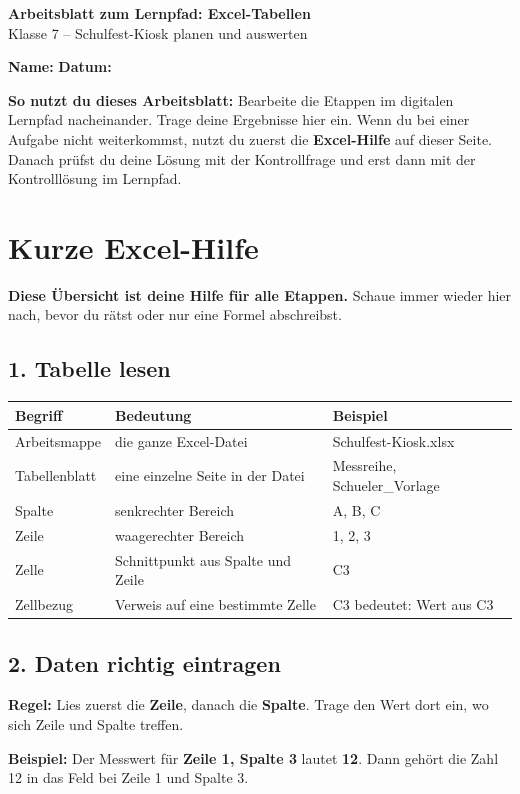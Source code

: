 
\begin{center}
{\LARGE\bfseries Arbeitsblatt zum Lernpfad: Excel-Tabellen}\\[1mm]
{\large Klasse 7 -- Schulfest-Kiosk planen und auswerten}
\end{center}

\begin{boxK}
\textbf{Name:} \linie[5.8cm] \hfill \textbf{Datum:} \linie[4.4cm]

\textbf{So nutzt du dieses Arbeitsblatt:} Bearbeite die Etappen im digitalen Lernpfad nacheinander. Trage deine Ergebnisse hier ein. Wenn du bei einer Aufgabe nicht weiterkommst, nutzt du zuerst die \textbf{Excel-Hilfe} auf dieser Seite. Danach prüfst du deine Lösung mit der Kontrollfrage und erst dann mit der Kontrolllösung im Lernpfad.
\end{boxK}

\section*{Kurze Excel-Hilfe}
\begin{boxHinweis}
\textbf{Diese Übersicht ist deine Hilfe für alle Etappen.} Schaue immer wieder hier nach, bevor du rätst oder nur eine Formel abschreibst.
\end{boxHinweis}

\subsection*{1. Tabelle lesen}
\begin{tabularx}{\textwidth}{|L{3.0cm}|Y|L{3.0cm}|}
\hline
{}\textbf{Begriff} & \textbf{Bedeutung} & \textbf{Beispiel}\\\hline
Arbeitsmappe & die ganze Excel-Datei & Schulfest-Kiosk.xlsx\\\hline
Tabellenblatt & eine einzelne Seite in der Datei & Messreihe, Schueler\_Vorlage\\\hline
Spalte & senkrechter Bereich & A, B, C\\\hline
Zeile & waagerechter Bereich & 1, 2, 3\\\hline
Zelle & Schnittpunkt aus Spalte und Zeile & C3\\\hline
Zellbezug & Verweis auf eine bestimmte Zelle & C3 bedeutet: Wert aus C3\\\hline
\end{tabularx}

\subsection*{2. Daten richtig eintragen}
\begin{boxK}
\textbf{Regel:} Lies zuerst die \textbf{Zeile}, danach die \textbf{Spalte}. Trage den Wert dort ein, wo sich Zeile und Spalte treffen.

\textbf{Beispiel:} Der Messwert für \textbf{Zeile 1, Spalte 3} lautet \textbf{12}. Dann gehört die Zahl 12 in das Feld bei Zeile 1 und Spalte 3.
\end{boxK}

